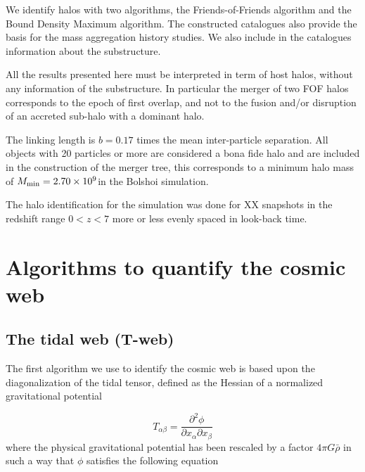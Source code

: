\documentclass[usenatbib]{latex/mn2e}
\begin{document}
We identify halos with two algorithms, the Friends-of-Friends  algorithm and the Bound Density Maximum algorithm. The 
constructed catalogues also provide the basis for the mass aggregation 
history studies. We also include in the catalogues information about the 
substructure.



All the results presented here must be interpreted in term of host halos, 
without any information of the substructure. In particular the merger of 
two FOF halos corresponds to the epoch of first overlap, and not to the 
fusion and/or disruption of an accreted sub-halo with a dominant halo. 



The linking length is $b=0.17$ times the mean inter-particle separation. 
All objects with 20 particles or more are considered a bona fide halo and 
are included in the construction of the merger tree, this corresponds to a 
minimum halo mass of $M_{\rm min}=2.70\times 10^{9}$\hMsun in the Bolshoi 
simulation.



The halo identification for the simulation was done for XX snapshots in 
the redshift range $0<z<7$ more or less evenly spaced in look-back time.



\section{Algorithms to quantify the cosmic web}
\label{sec:algorithms_cosmic_web}



\subsection{The tidal web (T-web)}
\label{subsec:Tweb}



The first algorithm  we use to identify the cosmic web is based upon the
diagonalization of the tidal tensor, defined as the Hessian of a 
normalized gravitational potential  


\begin{equation}
T_{\alpha\beta} = \frac{\partial^2\phi}{\partial x_{\alpha}\partial x_{\beta}}
\end{equation}
where the physical gravitational potential has been rescaled by a factor 
$4\pi G\bar{\rho}$ in such a way that $\phi$ satisfies the following 
equation
\end{document}
